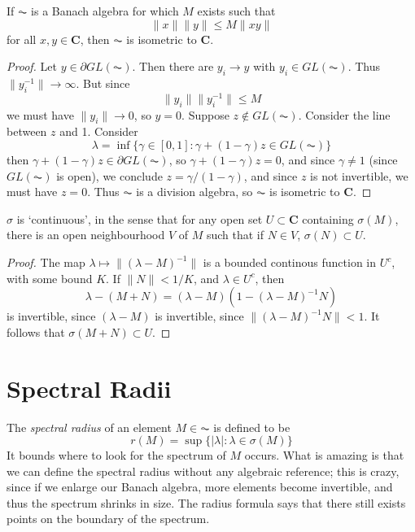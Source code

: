 \begin{theorem}
    If $\AC$ is a Banach algebra for which $M$ exists such that
    \[ \| x \| \| y \| \leq M \| x y \| \]
    for all $x,y \in \mathbf{C}$, then $\AC$ is isometric to $\mathbf{C}$.
\end{theorem}
\begin{proof}
    Let $y \in \partial GL(\AC)$. Then there are $y_i \to y$ with $y_i \in GL(\AC)$. Thus $\| y_i^{-1} \| \to \infty$. But since
    \[ \| y_i \| \| y_i^{-1} \| \leq M \]
    we must have $\| y_i \| \to 0$, so $y = 0$. Suppose $z \not \in GL(\AC)$. Consider the line between $z$ and 1. Consider
    \[ \lambda = \inf \{ \gamma \in [0,1] : \gamma + (1 - \gamma) z \in GL(\AC) \} \]
    then $\gamma + (1 - \gamma) z \in \partial GL(\AC)$, so $\gamma + (1 - \gamma) z = 0$, and since $\gamma \neq 1$ (since $GL(\AC)$ is open), we conclude $z = \gamma/(1-\gamma)$, and since $z$ is not invertible, we must have $z = 0$. Thus $\AC$ is a division algebra, so $\AC$ is isometric to $\mathbf{C}$.
\end{proof}

\begin{theorem}
    $\sigma$ is `continuous', in the sense that for any open set $U \subset \mathbf{C}$ containing $\sigma(M)$, there is an open neighbourhood $V$ of $M$ such that if $N \in V$, $\sigma(N) \subset U$.
\end{theorem}
\begin{proof}
    The map $\lambda \mapsto \| (\lambda - M)^{-1} \|$ is a bounded continous function in $U^c$, with some bound $K$. If $\| N \| < 1/K$, and $\lambda \in U^c$, then
    \[ \lambda - (M + N) = (\lambda - M)(1 - (\lambda - M)^{-1}N) \]
    is invertible, since $(\lambda - M)$ is invertible, since $\| (\lambda - M)^{-1} N \| < 1$. It follows that $\sigma(M + N) \subset U$.
\end{proof}

\section{Spectral Radii}

The \emph{spectral radius} of an element $M \in \AC$ is defined to be
%
\[ r(M) = \sup \{ |\lambda| : \lambda \in \sigma(M) \} \]
%
It bounds where to look for the spectrum of $M$ occurs. What is amazing is that we can define the spectral radius without any algebraic reference; this is crazy, since if we enlarge our Banach algebra, more elements become invertible, and thus the spectrum shrinks in size. The radius formula says that there still exists points on the boundary of the spectrum.

